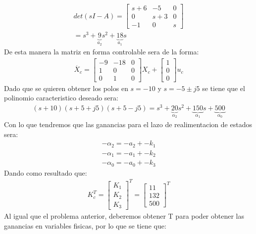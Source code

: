 \documentclass[
  11pt,
  letterpaper,
   addpoints,
   answers
  ]{exam}
\begin{document}
\begin{questions}
\begin{solution}
\begin{align}
    det(sI - A) =
    \begin{bmatrix}
        s + 6 & -5 & 0\\
        0 & s + 3 & 0\\
        -1 & 0 & s
    \end{bmatrix}\\
    = s^3 + 
    \underbrace{9}_{a_2}s^2 + 
    \underbrace{18}_{a_1}s
\end{align}
De esta manera la matriz en forma controlable sera de la forma:
\begin{align}
    \dot{X_{c}} =
    \begin{bmatrix}
        -9 & -18 & 0\\
        1 & 0 & 0\\
        0 & 1 & 0
    \end{bmatrix}
    X_{c} +
    \begin{bmatrix}
        1\\
        0\\
        0
    \end{bmatrix}
    u_{c}
\end{align}
Dado que se quieren obtener los polos en \( s = -10 \) y \( s = -5 \pm j5 \) se tiene que el polinomio caracteristico deseado sera:
\begin{align}
    (s+10)(s+5+j5)(s+5-j5) = s^3 + 
    \underbrace{20}_{\alpha_2}s^2 + 
    \underbrace{150}_{\alpha_1}s + 
    \underbrace{500}_{\alpha_0}
\end{align}
Con lo que tendremos que las ganancias para el lazo de realimentacion de estados sera:
\begin{align}
    -\alpha_{2} = -a_{2} + -k_{1}\\
    -\alpha_{1} = -a_{1} + -k_{2}\\
    -\alpha_{0} = -a_{0} + -k_{3}
\end{align}
Dando como resultado que:
\begin{align}
    K_c^T =
\begin{bmatrix}
    K_1 \\
    K_2 \\
    K_3
\end{bmatrix}^T =
\begin{bmatrix}
    11 \\
    132 \\
    500
\end{bmatrix}^T
\end{align}
Al igual que el problema anterior, deberemos obtener T para poder obtener las ganancias en variables fisicas, por lo que se tiene que:

\end{solution}
\end{questions}
\end{document}
